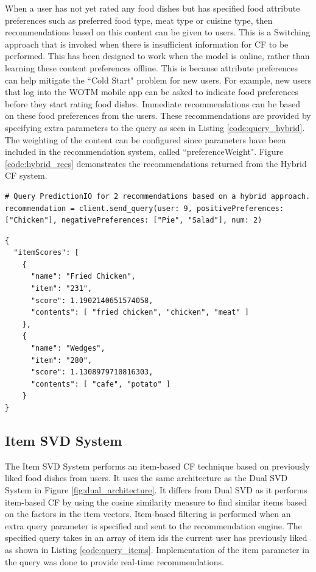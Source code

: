 When a user has not yet rated any food dishes but has specified food attribute preferences such as preferred food type, meat type or cuisine type, then recommendations based on this content can be given to users. This is a Switching \cite{spiegel2010hybrid} approach that is invoked when there is insufficient information for CF to be performed. This has been designed to work when the model is online, rather than learning these content preferences offline. This is because attribute preferences can help mitigate the ``Cold Start" problem for new users. For example, new users that log into the WOTM mobile app can be asked to indicate food preferences before they start rating food dishes. Immediate recommendations can be based on these food preferences from the users. These recommendations are provided by specifying extra parameters to the query as seen in Listing \ref{code:query_hybrid}. The weighting of the content can be configured since parameters have been included in the recommendation system, called ``preferenceWeight". Figure \ref{code:hybrid_recs} demonstrates the recommendations returned from the Hybrid CF system.

\begin{lstlisting}[caption={Query for recommendations based on hybrid CF}, label={code:query_hybrid}]
# Query PredictionIO for 2 recommendations based on a hybrid approach.
recommendation = client.send_query(user: 9, positivePreferences: ["Chicken"], negativePreferences: ["Pie", "Salad"], num: 2)
\end{lstlisting}

\begin{lstlisting}[caption={two recommendations for user 9 based on hybrid CF}, label={code:hybrid_recs}]
{
  "itemScores": [
    {
      "name": "Fried Chicken",
      "item": "231",
      "score": 1.1902140651574058,
      "contents": [ "fried chicken", "chicken", "meat" ]
    },
    {
      "name": "Wedges",
      "item": "280",
      "score": 1.1308979710816303,
      "contents": [ "cafe", "potato" ]
    }
}
\end{lstlisting}

\subsection{Item SVD System}

The Item SVD System performs an item-based CF technique based on previously liked food dishes from users. It uses the same architecture as the Dual SVD System in Figure \ref{fig:dual_architecture}. It differs from Dual SVD as it performs item-based CF by using the cosine similarity measure to find similar items based on the factors in the item vectors. Item-based filtering is performed when an extra query parameter is specified and sent to the recommendation engine. The specified query takes in an array of item ids the current user has previously liked as shown in Listing \ref{code:query_items}. Implementation of the item parameter in the query was done to provide real-time recommendations.

